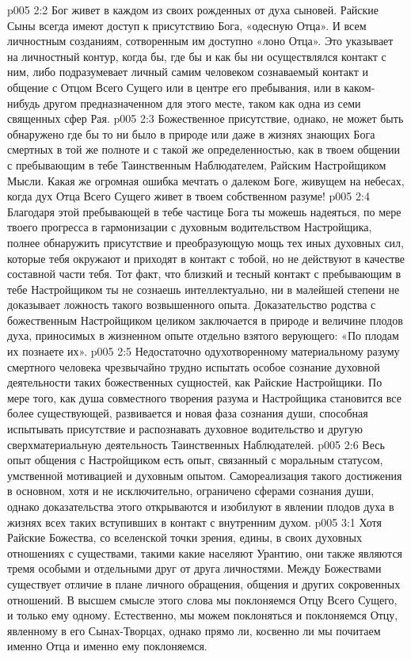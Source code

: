 \vs p005 2:2 Бог живет в каждом из своих рожденных от духа сыновей. Райские Сыны всегда имеют доступ к присутствию Бога, «одесную Отца». И всем личностным созданиям, сотворенным им доступно «лоно Отца». Это указывает на личностный контур, когда бы, где бы и как бы ни осуществлялся контакт с ним, либо подразумевает личный самим человеком сознаваемый контакт и общение с Отцом Всего Сущего или в центре его пребывания, или в каком\hyp{}нибудь другом предназначенном для этого месте, таком как одна из семи священных сфер Рая.
\vs p005 2:3 Божественное присутствие, однако, не может быть обнаружено где бы то ни было в природе или даже в жизнях знающих Бога смертных в той же полноте и с такой же определенностью, как в твоем общении с пребывающим в тебе Таинственным Наблюдателем, Райским Настройщиком Мысли. Какая же огромная ошибка мечтать о далеком Боге, живущем на небесах, когда дух Отца Всего Сущего живет в твоем собственном разуме!
\vs p005 2:4 \pc Благодаря этой пребывающей в тебе частице Бога ты можешь надеяться, по мере твоего прогресса в гармонизации с духовным водительством Настройщика, полнее обнаружить присутствие и преобразующую мощь тех иных духовных сил, которые тебя окружают и приходят в контакт с тобой, но не действуют в качестве составной части тебя. Тот факт, что близкий и тесный контакт с пребывающим в тебе Настройщиком ты не сознаешь интеллектуально, ни в малейшей степени не доказывает ложность такого возвышенного опыта. Доказательство родства с божественным Настройщиком целиком заключается в природе и величине плодов духа, приносимых в жизненном опыте отдельно взятого верующего: «По плодам их познаете их».
\vs p005 2:5 Недостаточно одухотворенному материальному разуму смертного человека чрезвычайно трудно испытать особое сознание духовной деятельности таких божественных сущностей, как Райские Настройщики. По мере того, как душа совместного творения разума и Настройщика становится все более существующей, развивается и новая фаза сознания души, способная испытывать присутствие и распознавать духовное водительство и другую сверхматериальную деятельность Таинственных Наблюдателей.
\vs p005 2:6 Весь опыт общения с Настройщиком есть опыт, связанный с моральным статусом, умственной мотивацией и духовным опытом. Самореализация такого достижения в основном, хотя и не исключительно, ограничено сферами сознания души, однако доказательства этого открываются и изобилуют в явлении плодов духа в жизнях всех таких вступивших в контакт с внутренним духом.
\vs p005 3:1 Хотя Райские Божества, со вселенской точки зрения, едины, в своих духовных отношениях с существами, такими какие населяют Урантию, они также являются тремя особыми и отдельными друг от друга личностями. Между Божествами существует отличие в плане личного обращения, общения и других сокровенных отношений. В высшем смысле этого слова мы поклоняемся Отцу Всего Сущего, и только ему одному. Естественно, мы можем поклоняться и поклоняемся Отцу, явленному в его Сынах\hyp{}Творцах, однако прямо ли, косвенно ли мы почитаем именно Отца и именно ему поклоняемся.
